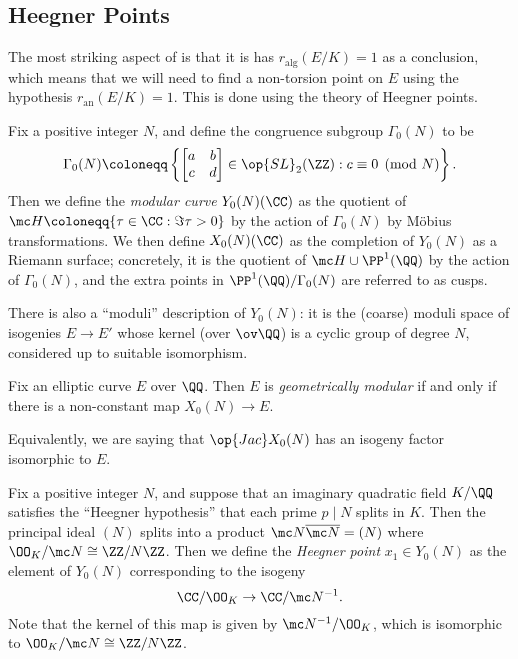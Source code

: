\documentclass[../notes.tex]{subfiles}
\begin{document}
\subsection{Heegner Points}
The most striking aspect of  is that it is has $r_{\mathrm{alg}}(E/K)=1$ as a conclusion, which means that we will need to find a non-torsion point on $E$ using the hypothesis $r_{\mathrm{an}}(E/K)=1$. This is done using the theory of Heegner points.
\begin{definition}
	Fix a positive integer $N$, and define the congruence subgroup $\Gamma_0(N)$ to be
	\[\Gamma_0(N)\coloneqq\left\{\begin{bmatrix}
		a & b \\ c & d
	\end{bmatrix}\in\op{SL}_2(\ZZ):c\equiv0\pmod N\right\}.\]
	Then we define the \textit{modular curve} $Y_0(N)(\CC)$ as the quotient of $\mc H\coloneqq\{\tau\in\CC:\Im\tau>0\}$ by the action of $\Gamma_0(N)$ by M\"obius transformations. We then define $X_0(N)(\CC)$ as the completion of $Y_0(N)$ as a Riemann surface; concretely, it is the quotient of $\mc H\cup\PP^1(\QQ)$ by the action of $\Gamma_0(N)$, and the extra points in $\PP^1(\QQ)/\Gamma_0(N)$ are referred to as cusps.
\end{definition}
\begin{remark}
	There is also a ``moduli'' description of $Y_0(N)$: it is the (coarse) moduli space of isogenies $E\to E'$ whose kernel (over $\ov\QQ$) is a cyclic group of degree $N$, considered up to suitable isomorphism.
\end{remark}
\begin{definition}
	Fix an elliptic curve $E$ over $\QQ$. Then $E$ is \textit{geometrically modular} if and only if there is a non-constant map $X_0(N)\to E$.
\end{definition}
\begin{remark}
	Equivalently, we are saying that $\op{Jac}X_0(N)$ has an isogeny factor isomorphic to $E$.
\end{remark}
\begin{definition}
	Fix a positive integer $N$, and suppose that an imaginary quadratic field $K/\QQ$ satisfies the ``Heegner hypothesis'' that each prime $p\mid N$ splits in $K$. Then the principal ideal $(N)$ splits into a product $\mc N\overline{\mc N}=(N)$ where $\OO_K/\mc N\cong\ZZ/N\ZZ$. Then we define the \textit{Heegner point} $x_1\in Y_0(N)$ as the element of $Y_0(N)$ corresponding to the isogeny
	\[\CC/\OO_K\to\CC/\mc N^{-1}.\]
	Note that the kernel of this map is given by $\mc N^{-1}/\OO_K$, which is isomorphic to $\OO_K/\mc N\cong\ZZ/N\ZZ$.
\end{definition}
\end{document}
